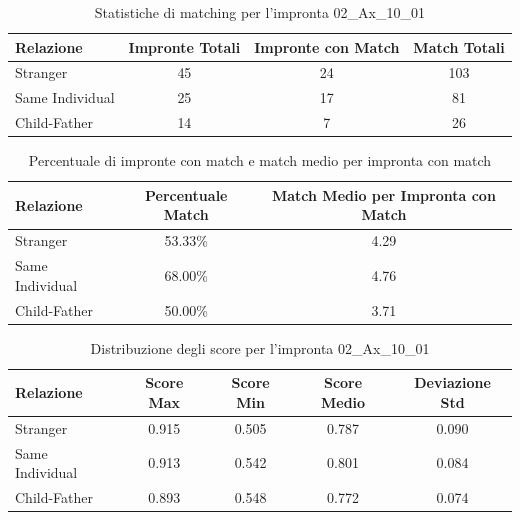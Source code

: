 \begin{table}[htbp]
\centering
\caption{Statistiche di matching per l'impronta 02\_Ax\_10\_01}
\label{tab:results_02_Ax_10_01}
\begin{tabular}{|l|c|c|c|}
\hline
\textbf{Relazione} & \textbf{Impronte Totali} & \textbf{Impronte con Match} & \textbf{Match Totali} \\
\hline
Stranger & 45 & 24 & 103 \\
\hline
Same Individual & 25 & 17 & 81 \\
\hline
Child-Father & 14 & 7 & 26 \\
\hline
\end{tabular}
\end{table}


\begin{table}[htbp]
\centering
\caption{Percentuale di impronte con match e match medio per impronta con match}
\label{tab:match_percentage_02_Ax_10_01}
\begin{tabular}{|l|c|c|}
\hline
\textbf{Relazione} & \textbf{Percentuale Match} & \textbf{Match Medio per Impronta con Match} \\
\hline
Stranger & 53.33\% & 4.29 \\
\hline
Same Individual & 68.00\% & 4.76 \\
\hline
Child-Father & 50.00\% & 3.71 \\
\hline
\end{tabular}
\end{table}


\begin{table}[htbp]
\centering
\caption{Distribuzione degli score per l'impronta 02\_Ax\_10\_01}
\label{tab:scores_02_Ax_10_01}
\begin{tabular}{|l|c|c|c|c|}
\hline
\textbf{Relazione} & \textbf{Score Max} & \textbf{Score Min} & \textbf{Score Medio} & \textbf{Deviazione Std} \\
\hline
Stranger & 0.915 & 0.505 & 0.787 & 0.090 \\
\hline
Same Individual & 0.913 & 0.542 & 0.801 & 0.084 \\
\hline
Child-Father & 0.893 & 0.548 & 0.772 & 0.074 \\
\hline
\end{tabular}
\end{table}

